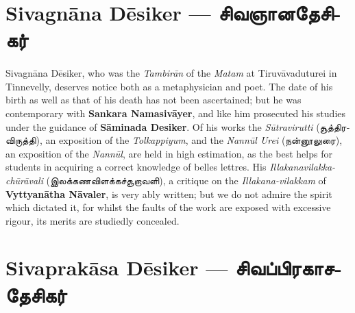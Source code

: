 \documentclass{article}
\newcommand{\TamilText}[1]{\texttamil{#1}}
\newcommand{\TamilBold}[1]{\texttamil{\textbf{#1}}}
\newcommand{\tam}[1]{\TamilText{#1}}
\newcommand{\tambold}[1]{\TamilBold{#1}}
\begin{document}
\section{Sivagn\={a}na D\={e}siker --- \tambold{சிவஞானதேசிகர்}}
\paragraph{}
Sivagn\={a}na D\={e}siker, who was the \emph{Tambir\={a}n} of the \emph{Matam} at Tiruv\={a}vaduturei in Tinnevelly, deserves notice both as a metaphysician and poet. The date of his birth as well as that of his death has not been ascertained; but he was contemporary with \textbf{Sankara Namasiv\={a}yer}, and like him prosecuted his studies under the guidance of \textbf{S\={a}minada Desiker}. Of his works the \emph{S\={u}travirutti} (\tam{சூத்திரவிருத்தி}), an exposition of the \emph{Tolkappiyum}, and the \emph{Nann\={u}l Urei} (\tam{நன்னூலுரை}), an exposition of the \emph{Nann\={u}l}, are held in high estimation, as the best helps for students in acquiring a correct knowledge of belles lettres. His \emph{Illakanavilakka-ch\={u}r\={a}vali} (\tam{இலக்கணவிளக்கச்சூறாவளி}), a critique on the \emph{Illakana-vilakkam} of \textbf{Vyttyan\={a}tha N\={a}valer}, is very ably written; but we do not admire the spirit which dictated it, for whilst the faults of the work are exposed with excessive rigour, its merits are studiedly concealed.

\section{Sivaprak\={a}sa D\={e}siker --- \tambold{சிவப்பிரகாசதேசிகர்}}
\end{document}
